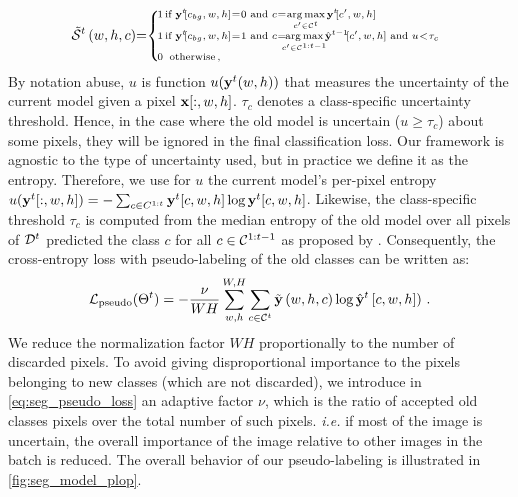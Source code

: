 \begin{equation}
    \scriptsize
    \tilde \mcS^{t}\left(w,h,c\right)\mkern-5mu = \mkern-5mu \left\{\begin{array}{ll}
        \mkern-14mu 1 \mkern-27mu & \mkern-8mu \text { if } \vy^{t} \mkern-4mu [c_{bg},w,h]\mkern-4mu = \mkern-4mu 0 \text { and } c \mkern-4mu = \mkern-4mu \argmax \limits_{c' \in \mcC^{t}} \vy^{t} \mkern-4mu [c',w,h]                                                                          \\
        \mkern-14mu 1 \mkern-27mu & \mkern-8mu \text { if } \vy^{t} \mkern-4mu [c_{bg},w,h] \mkern-4mu = \mkern-4mu 1 \text { and } c \mkern-4mu = \mkern-12mu \argmax \limits_{c' \in \mcC^{1:t-1}} \mkern-6mu \hat \vy^{t-1} \mkern-4mu [c',w,h]  \text{ and } u \mkern-4mu < \mkern-4mu \tau_{c} \\
        \mkern-14mu 0 \mkern-27mu & \mkern-4mu \,\text { otherwise\,, }                                                                                                                                                                                                                             \\
    \end{array}\right.
    \label{eq:seg_pseudo_bis_uncertain}
\end{equation}
%
By notation abuse, $u$ is function $u(\mathbf{y}^t(w, h))$ that measures the uncertainty of the current
model given a pixel $\mathbf{x}[:,w,h]$. $\tau_{c}$ denotes a class-specific uncertainty threshold. Hence,
in the case where the old model is uncertain ($u \ge \tau_c$) about some pixels, they will be
ignored in the final classification loss. Our framework is agnostic to the type of uncertainty used,
but in practice we define it as the entropy. Therefore, we use for $u$ the current model's per-pixel
entropy $u(\mathbf{y}^t[:,w, h]) = -\sum_{c \in C^{1:t}} \mathbf{y}^t[c,w, h] \log \mathbf{y}^t[c,w, h]$. Likewise,
the class-specific threshold $\tau_c$ is computed from the median entropy of the old model over all
pixels of $\mathcal{D}^t$ predicted the class $c$ for all $c \in \mathcal{C}^{1:t-1}$ as proposed by
\cite{saporta2020esl}. Consequently, the cross-entropy loss with pseudo-labeling of the old classes
can be written as:
%
\begin{equation}
    \mathcal{L}_\text{pseudo}(\Theta^t)=- \frac{\nu}{WH} \sum_{w,h}^{W,H} \sum_{c \in \mathcal{C}^{t}} \tilde {\mathbf{y}}\left(w,h,c\right) \log \hat {\mathbf{y}}^{t}\left[c,w,h]\right)\,.
    \label{eq:seg_pseudo_loss}
\end{equation}
%
We reduce the normalization factor $WH$ proportionally to the number of discarded pixels. To avoid
giving disproportional importance to the pixels belonging to new classes (which are not discarded),
we introduce in \autoref{eq:seg_pseudo_loss} an adaptive factor $\nu$, which is the ratio of
accepted old classes pixels over the total number of such pixels. \textit{i.e.} if most of the image
is uncertain, the overall importance of the image relative to other images in the batch is reduced.
The overall behavior of our pseudo-labeling is illustrated in \autoref{fig:seg_model_plop}.

